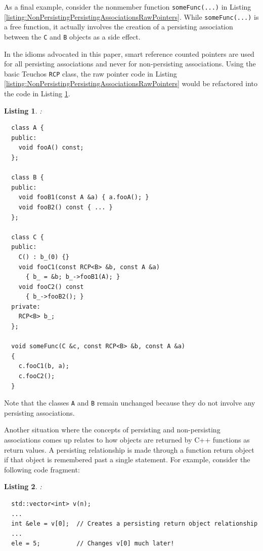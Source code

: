 \documentclass[pdf,ps2pdf,11pt]{SANDreport}
\newtheorem{listing}{Listing}
\begin{document}
As a final example, consider the nonmember function
{}\texttt{someFunc(...)} in Listing
{}\ref{listing:NonPersistingPersistingAssociationsRawPointers}.  While
{}\texttt{someFunc(...)} is a free function, it actually involves the
creation of a persisting association between the {}\texttt{C} and
{}\texttt{B} objects as a side effect.

In the idioms advocated in this paper, smart reference counted
pointers are used for all persisting associations and never for
non-persisting associations.  Using the basic Teuchos {}\texttt{RCP}
class, the raw pointer code in Listing
{}\ref{listing:NonPersistingPersistingAssociationsRawPointers} would
be refactored into the code in Listing
{}\ref{listing:NonPersistingPersistingAssociationsRCP}.

\begin{listing}:\\
\label{listing:NonPersistingPersistingAssociationsRCP}
{\small\begin{verbatim}
  class A {
  public:
    void fooA() const;
  };

  class B {
  public:
    void fooB1(const A &a) { a.fooA(); }
    void fooB2() const { ... }
  };

  class C {
  public:
    C() : b_(0) {}
    void fooC1(const RCP<B> &b, const A &a)
      { b_ = &b; b_->fooB1(A); }
    void fooC2() const
      { b_->fooB2(); }
  private:
    RCP<B> b_;
  };

  void someFunc(C &c, const RCP<B> &b, const A &a)
  {
    c.fooC1(b, a);
    c.fooC2();
  }
\end{verbatim}}
\end{listing}

Note that the classes {}\texttt{A} and {}\texttt{B} remain unchanged
because they do not involve any persisting associations.

Another situation where the concepts of persisting and non-persisting
associations comes up relates to how objects are returned by C++
functions as return values.  A persisting relationship is made through
a function return object if that object is remembered past a single
statement.  For example, consider the following code fragment:

\begin{listing}:\\
{\small\begin{verbatim}
  std::vector<int> v(n);
  ...
  int &ele = v[0];  // Creates a persisting return object relationship
  ...
  ele = 5;          // Changes v[0] much later!
\end{verbatim}}
\end{listing}
\end{document}
